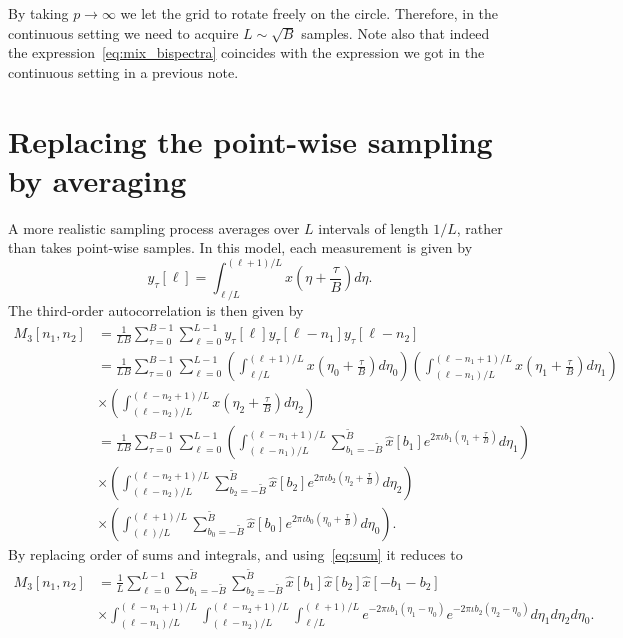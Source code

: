 \documentclass[english,12pt]{article}
\newcommand{\I}{\iota}
\newcommand{\tB}{\tilde{B}}
\begin{document}
By taking $p\to\infty$ we let the grid to rotate freely on the circle. Therefore, in the continuous setting we need to acquire $L\sim\sqrt{B}$ samples. Note also that indeed the expression~\eqref{eq:mix_bispectra} coincides with the expression we got in the continuous setting in a previous note.

\section{Replacing the point-wise sampling by averaging}

A more realistic sampling process averages over $L$  intervals of length $1/L$, rather than takes point-wise samples.  
In this model, each measurement is given by 
\begin{equation}
y_\tau[\ell] = \int_{\ell/L}^{(\ell+1)/L}x\left(\eta + \frac{\tau}{B}\right)d\eta.
\end{equation}
The third-order autocorrelation is then given by 
\begin{equation}
\begin{split}
M_3[n_1,n_2] &= \frac{1}{LB}\sum_{\tau=0}^{B-1}\sum_{\ell=0}^{L-1} y_\tau[\ell] y_\tau[\ell-n_1] y_\tau[\ell-n_2]\\ 
&= \frac{1}{LB}\sum_{\tau=0}^{B-1}\sum_{\ell=0}^{L-1} \left(\int_{\ell/L}^{(\ell+1)/L}x\left(\eta_0 + \frac{\tau}{B}\right)d\eta_0\right)
\left(\int_{(\ell-n_1)/L}^{(\ell-n_1+1)/L}x\left(\eta_1 + \frac{\tau}{B}\right)d\eta_1\right) \\ 
&\times 
\left(\int_{(\ell-n_2)/L}^{(\ell-n_2+1)/L}x\left(\eta_2 + \frac{\tau}{B}\right)d\eta_2\right)
\\
&= \frac{1}{LB}\sum_{\tau=0}^{B-1}\sum_{\ell=0}^{L-1} 
\left(\int_{(\ell-n_1)/L}^{(\ell-n_1+1)/L}\sum_{b_1=-\tB}^{\tB}\hat{x}[b_1]e^{2\pi\I b_1 \left(\eta_1 + \frac{\tau}{B}\right) } d\eta_1\right) \\&\times 
\left(\int_{(\ell-n_2)/L}^{(\ell-n_2+1)/L}\sum_{b_2=-\tB}^{\tB}\hat{x}[b_2]e^{2\pi\I b_2 \left(\eta_2 + \frac{\tau}{B}\right) } d\eta_2\right) \\&\times 
\left(\int_{(\ell)/L}^{(\ell+1)/L}\sum_{b_0=-\tB}^{\tB}\hat{x}[b_0]e^{2\pi\I b_0 \left(\eta_0 + \frac{\tau}{B}\right) } d\eta_0\right).
\end{split}
\end{equation}
By replacing order of sums and integrals, and using~\eqref{eq:sum} it reduces to 
\begin{equation}
\begin{split}
M_3[n_1,n_2] 
&= \frac{1}{L}\sum_{\ell=0}^{L-1}\sum_{b_1=-\tB}^{\tB}\sum_{b_2=-\tB}^{\tB} \hat{x}[b_1]\hat{x}[b_2]\hat{x}[-b_1-b_2] \\
&\times \int_{(\ell-n_1)/L}^{(\ell-n_1+1)/L}
\int_{(\ell-n_2)/L}^{(\ell-n_2+1)/L}
\int_{\ell/L}^{(\ell+1)/L}
e^{-2\pi\I b_1(\eta_1-\eta_0) } 
e^{-2\pi\I b_2(\eta_2-\eta_0) }
 d\eta_1  d\eta_2 d\eta_0.
\end{split}
\end{equation}
\end{document}
